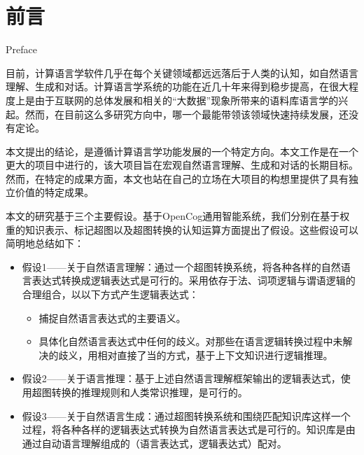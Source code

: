 ﻿\chapter{前言}{Preface}

目前，计算语言学软件几乎在每个关键领域都远远落后于人类的认知，如自然语言理解、生成和对话。计算语言学系统的功能在近几十年来得到稳步提高，在很大程度上是由于互联网的总体发展和相关的“大数据”现象所带来的语料库语言学的兴起。然而，在目前这么多研究方向中，哪一个最能带领该领域快速持续发展，还没有定论。

本文提出的结论，是遵循计算语言学功能发展的一个特定方向。本文工作是在一个更大的项目中进行的，该大项目旨在宏观自然语言理解、生成和对话的长期目标。然而，在特定的成果方面，本文也站在自己的立场在大项目的构想里提供了具有独立价值的特定成果。

本文的研究基于三个主要假设。基于OpenCog通用智能系统，我们分别在基于权重的知识表示、标记超图以及超图转换的认知运算方面提出了假设。这些假设可以简明地总结如下：

\begin{itemize}
\item 假设1——关于自然语言理解：通过一个超图转换系统，将各种各样的自然语言表达式转换成逻辑表达式是可行的。采用依存于法、词项逻辑与谓语逻辑的合理组合，以以下方式产生逻辑表达式：
    \begin{itemize}
    \item 捕捉自然语言表达式的主要语义。
    \item 具体化自然语言表达式中任何的歧义。对那些在语言逻辑转换过程中未解决的歧义，用相对直接了当的方式，基于上下文知识进行逻辑推理。
    \end{itemize}
\item 假设2——关于语言推理：基于上述自然语言理解框架输出的逻辑表达式，使用超图转换的推理规则和人类常识推理，是可行的。
\item 假设3——关于自然语言生成：通过超图转换系统和围绕匹配知识库这样一个过程，将各种各样的逻辑表达式转换为自然语言表达式是可行的。知识库是由通过自动语言理解组成的（语言表达式，逻辑表达式）配对。
\end{itemize}

